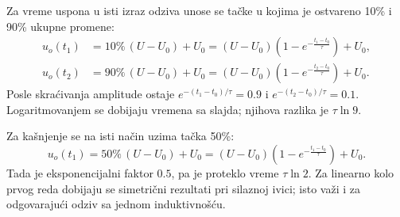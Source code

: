 Za vreme uspona u isti izraz odziva unose se tačke u kojima je ostvareno 10\% i 90\% ukupne promene:
\begin{align*}
u_o(t_1)&=10\%\,(U-U_0)+U_0=(U-U_0)\left(1-e^{-\frac{t_1-t_0}{\tau}}\right)+U_0,\\
u_o(t_2)&=90\%\,(U-U_0)+U_0=(U-U_0)\left(1-e^{-\frac{t_2-t_0}{\tau}}\right)+U_0.
\end{align*}
Posle skraćivanja amplitude ostaje $e^{-(t_1-t_0)/\tau}=0.9$ i $e^{-(t_2-t_0)/\tau}=0.1$. Logaritmovanjem se dobijaju vremena sa slajda; njihova razlika je $\tau\ln9$.

Za kašnjenje se na isti način uzima tačka 50\%:
\[u_o(t_1)=50\%\,(U-U_0)+U_0=(U-U_0)\left(1-e^{-\frac{t_1-t_0}{\tau}}\right)+U_0.\]
Tada je eksponencijalni faktor $0.5$, pa je proteklo vreme $\tau\ln2$. Za linearno kolo prvog reda dobijaju se simetrični rezultati pri silaznoj ivici; isto važi i za odgovarajući odziv sa jednom induktivnošću.
